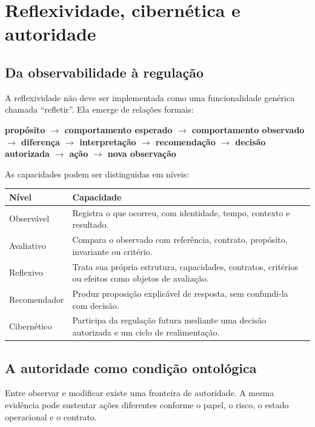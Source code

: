\documentclass[11pt,a4paper,oneside]{article}
\begin{document}
\section{Reflexividade, cibernética e autoridade}

\subsection{Da observabilidade à regulação}

A reflexividade não deve ser implementada como uma funcionalidade genérica chamada ``refletir''. Ela emerge de relações formais:

\begin{principio}
\centering
\textbf{propósito $\rightarrow$ comportamento esperado $\rightarrow$ comportamento observado $\rightarrow$ diferença $\rightarrow$ interpretação $\rightarrow$ recomendação $\rightarrow$ decisão autorizada $\rightarrow$ ação $\rightarrow$ nova observação}
\end{principio}

As capacidades podem ser distinguidas em níveis:

\begin{longtable}{P{3.0cm}P{10.4cm}}
\toprule
\textbf{Nível} & \textbf{Capacidade} \\
\midrule
\endhead
Observável & Registra o que ocorreu, com identidade, tempo, contexto e resultado. \\
Avaliativo & Compara o observado com referência, contrato, propósito, invariante ou critério. \\
Reflexivo & Trata sua própria estrutura, capacidades, contratos, critérios ou efeitos como objetos de avaliação. \\
Recomendador & Produz proposição explicável de resposta, sem confundi-la com decisão. \\
Cibernético & Participa da regulação futura mediante uma decisão autorizada e um ciclo de realimentação. \\
\bottomrule
\end{longtable}

\subsection{A autoridade como condição ontológica}

Entre observar e modificar existe uma fronteira de autoridade. A mesma evidência pode sustentar ações diferentes conforme o papel, o risco, o estado operacional e o contrato.
\end{document}

